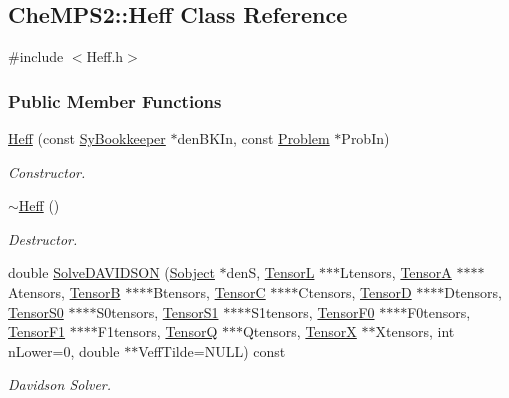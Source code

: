 \hypertarget{classCheMPS2_1_1Heff}{\subsection{Che\-M\-P\-S2\-:\-:Heff Class Reference}
\label{classCheMPS2_1_1Heff}
}


{\ttfamily \#include $<$Heff.\-h$>$}

\subsubsection*{Public Member Functions}
\begin{DoxyCompactItemize}
\item 
\hyperlink{classCheMPS2_1_1Heff_ade178b3ffb362e0b407f50e6393e6f1c}{Heff} (const \hyperlink{classCheMPS2_1_1SyBookkeeper}{Sy\-Bookkeeper} $\ast$den\-B\-K\-In, const \hyperlink{classCheMPS2_1_1Problem}{Problem} $\ast$Prob\-In)
\begin{DoxyCompactList}\small\item\em Constructor. \end{DoxyCompactList}\item 
\hypertarget{classCheMPS2_1_1Heff_aaa1c2a606d65807f669b2a6cbbd9b510}{\hyperlink{classCheMPS2_1_1Heff_aaa1c2a606d65807f669b2a6cbbd9b510}{$\sim$\-Heff} ()}\label{classCheMPS2_1_1Heff_aaa1c2a606d65807f669b2a6cbbd9b510}

\begin{DoxyCompactList}\small\item\em Destructor. \end{DoxyCompactList}\item 
double \hyperlink{classCheMPS2_1_1Heff_ab8ccd23cc035ed40e13705c3f2e581a3}{Solve\-D\-A\-V\-I\-D\-S\-O\-N} (\hyperlink{classCheMPS2_1_1Sobject}{Sobject} $\ast$den\-S, \hyperlink{classCheMPS2_1_1TensorL}{Tensor\-L} $\ast$$\ast$$\ast$Ltensors, \hyperlink{classCheMPS2_1_1TensorA}{Tensor\-A} $\ast$$\ast$$\ast$$\ast$Atensors, \hyperlink{classCheMPS2_1_1TensorB}{Tensor\-B} $\ast$$\ast$$\ast$$\ast$Btensors, \hyperlink{classCheMPS2_1_1TensorC}{Tensor\-C} $\ast$$\ast$$\ast$$\ast$Ctensors, \hyperlink{classCheMPS2_1_1TensorD}{Tensor\-D} $\ast$$\ast$$\ast$$\ast$Dtensors, \hyperlink{classCheMPS2_1_1TensorS0}{Tensor\-S0} $\ast$$\ast$$\ast$$\ast$S0tensors, \hyperlink{classCheMPS2_1_1TensorS1}{Tensor\-S1} $\ast$$\ast$$\ast$$\ast$S1tensors, \hyperlink{classCheMPS2_1_1TensorF0}{Tensor\-F0} $\ast$$\ast$$\ast$$\ast$F0tensors, \hyperlink{classCheMPS2_1_1TensorF1}{Tensor\-F1} $\ast$$\ast$$\ast$$\ast$F1tensors, \hyperlink{classCheMPS2_1_1TensorQ}{Tensor\-Q} $\ast$$\ast$$\ast$Qtensors, \hyperlink{classCheMPS2_1_1TensorX}{Tensor\-X} $\ast$$\ast$Xtensors, int n\-Lower=0, double $\ast$$\ast$Veff\-Tilde=N\-U\-L\-L) const 
\begin{DoxyCompactList}\small\item\em Davidson Solver. \end{DoxyCompactList}\end{DoxyCompactItemize}


